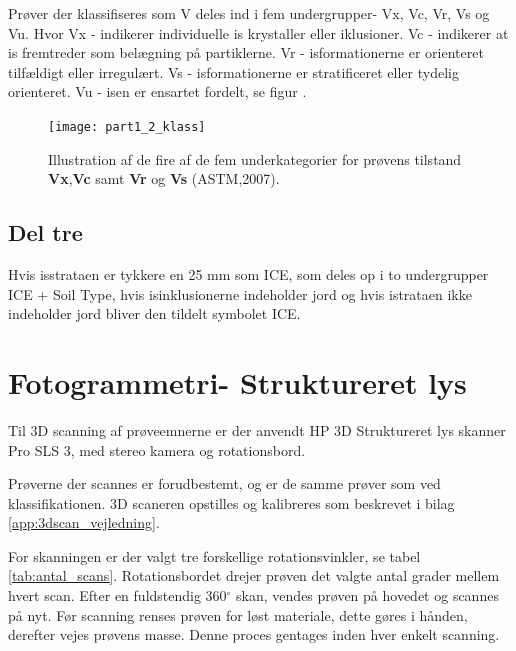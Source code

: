 Prøver der klassifiseres som V deles ind i fem undergrupper- Vx, Vc, Vr, Vs og Vu. Hvor Vx - indikerer individuelle is krystaller eller iklusioner. Vc - indikerer at is fremtreder som belægning på partiklerne. Vr - isformationerne er orienteret tilfældigt eller irregulært. Vs - isformationerne er stratificeret eller tydelig orienteret. Vu - isen er ensartet fordelt, se figur . 
%
\begin{figure}
\centering
\texttt{[image: part1\_2\_klass]}
\caption{Illustration af de fire af de fem underkategorier for prøvens tilstand \textbf{Vx},\textbf{Vc} samt \textbf{Vr} og \textbf{Vs} (ASTM,2007).}
\label{fig:del2_klass}
\end{figure}
%
\subsection{Del tre}
Hvis isstrataen er tykkere en 25 mm som ICE, som deles op i to undergrupper ICE + Soil Type, hvis isinklusionerne indeholder jord og hvis istrataen ikke indeholder jord bliver den tildelt symbolet ICE. 

\section{Fotogrammetri- Struktureret lys}
\FloatBlock
Til 3D scanning af prøveemnerne er der anvendt HP 3D Struktureret lys skanner Pro SLS 3, med stereo kamera og rotationsbord.

\noindent Prøverne der scannes er forudbestemt, og er de samme prøver som ved klassifikationen. 
3D scaneren opstilles og kalibreres som beskrevet i bilag \vref{app:3dscan_vejledning}.


\noindent For skanningen er der valgt tre forskellige rotationsvinkler, se tabel \vref{tab:antal_scans}. Rotationsbordet drejer prøven det valgte antal grader mellem hvert scan. Efter en fuldstendig  360$^{\circ}$ skan, vendes prøven på hovedet og scannes på nyt. Før scanning renses prøven for løst materiale, dette gøres i hånden, derefter vejes prøvens masse. Denne proces gentages inden hver enkelt scanning.

